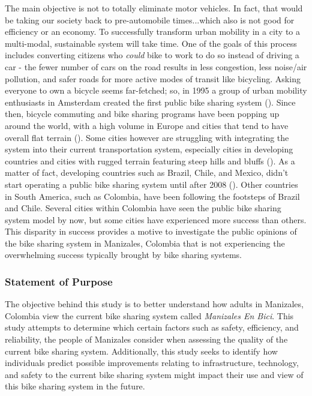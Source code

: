 \documentclass[12pt]{article}
\begin{document}
The main objective is not to totally eliminate motor vehicles. In fact, that would be taking our society back to pre-automobile times...which also is not good for efficiency or an economy. To successfully transform urban mobility in a city to a multi-modal, sustainable system will take time. One of the goals of this process includes converting citizens who \textit{could} bike to work to do so instead of driving a car - the fewer number of cars on the road results in less congestion, less noise/air pollution, and safer roads for more active modes of transit like bicycling. Asking everyone to own a bicycle seems far-fetched; so, in 1995 a group of urban mobility enthusiasts in Amsterdam created the first public bike sharing system (\cite{zuluaga_garcía_2017}). Since then, bicycle commuting and bike sharing programs have been popping up around the world, with a high volume in Europe and cities that tend to have overall flat terrain (\cite{DeliotteReport}). Some cities however are struggling with integrating the system into their current transportation system, especially cities in developing countries and cities with rugged terrain featuring steep hills and bluffs (\cite{zuluaga_garcía_2017}). As a matter of fact, developing countries such as Brazil, Chile, and Mexico, didn't start operating a public bike sharing system until after 2008 (\cite{midgley_2011}). Other countries in South America, such as Colombia, have been following the footsteps of Brazil and Chile. Several cities within Colombia have seen the public bike sharing system model by now, but some cities have experienced more success than others. This disparity in success provides a motive to investigate the public opinions of the bike sharing system in Manizales, Colombia that is not experiencing the overwhelming success typically brought by bike sharing systems. 
\subsubsection*{Statement of Purpose}
The objective behind this study is to better understand how adults in Manizales, Colombia view the current bike sharing system called \textit{Manizales En Bici}. This study attempts to determine which certain factors such as safety, efficiency, and reliability, the people of Manizales consider when assessing the quality of the current bike sharing system. Additionally, this study seeks to identify how individuals predict possible improvements relating to infrastructure, technology, and safety to the current bike sharing system might impact their use and view of this bike sharing system in the future.
\end{document}
